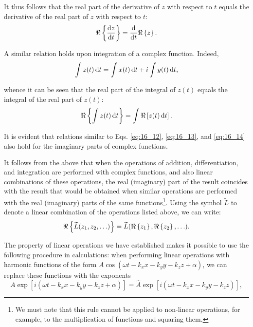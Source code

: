 \noindent
It thus follows that the real part of the derivative of $z$ with respect to $t$ equals the derivative of the real part of $z$ with respect to $t$:
\begin{equation}\label{eq:16_13}
    \Re\left\{\dfrac{\mathrm{d} z}{\mathrm{d} t}\right\} = \dfrac{\mathrm{d}}{\mathrm{d} t}\Re\left\{z\right\}.
\end{equation}

A similar relation holds upon integration of a complex function.
Indeed,
\begin{equation*}
    \int z(t)\, \mathrm{d} t = \int x(t)\, \mathrm{d} t + i \int y(t)\, \mathrm{d} t,
\end{equation*}

\noindent
whence it can be seen that the real part of the integral of $z(t)$ equals the integral of the real part of $z(t)$:
\begin{equation}\label{eq:16_14}
    \Re\left\{\int z(t)\, \mathrm{d} t\right\} = \int \Re\left[z(t)\, \mathrm{d} t\right].
\end{equation}

It is evident that relations similar to Eqs. \eqref{eq:16_12}, \eqref{eq:16_13}, and \eqref{eq:16_14} also hold for the imaginary parts of complex functions.

It follows from the above that when the operations of addition, differentiation, and integration are performed with complex functions, and also linear combinations of these operations, the real (imaginary) part of the result coincides with the result that would be obtained when similar operations are performed with the real (imaginary) parts of the same functions\footnote{We must note that this rule cannot be applied to non-linear operations, for example, to the multiplication of functions and squaring them.}.
Using the symbol $\widetilde{L}$ to denote a linear combination of the operations listed above, we can write:
\begin{equation}\label{eq:16_15}
    \Re\left\{\widetilde{L}(z_1, z_2, \ldots)\right\} = \widetilde{L}(\Re\left\{z_1\right\}, \Re\left\{z_2\right\}, \ldots).
\end{equation}

The property of linear operations we have established makes it possible to use the following procedure in calculations: when performing linear operations with harmonic functions of the form $A \cos(\omega t - k_x x - k_y y - k_z z + \alpha)$, we can replace these functions with the exponents
\begin{equation}\label{eq:16_16}
    A \exp[i (\omega t - k_x x - k_y y - k_z z + \alpha)] = \hat{A} \exp[i (\omega t - k_x x - k_y y - k_z z)],
\end{equation}

